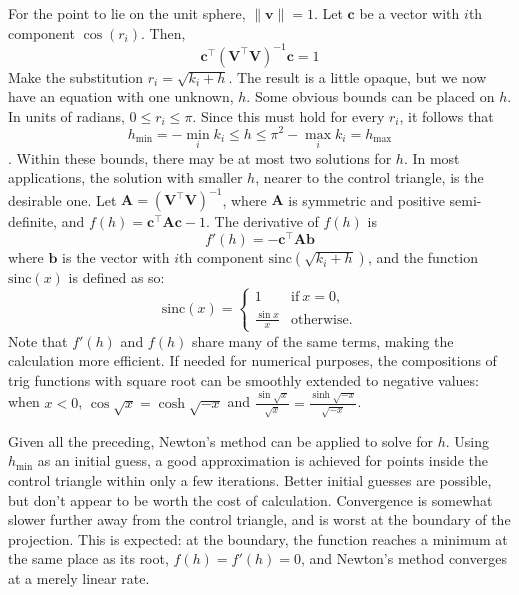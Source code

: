 \documentclass{amsart}[12pt]
\begin{document}
For the point to lie on the unit sphere, $\|\mathbf v\| = 1$. Let $\mathbf c$
be a vector with $i$th component $\cos\left(r_i \right)$. Then,
\begin{equation}
  \mathbf c^\top \left(\mathbf V^\top \mathbf V\right )^{-1} \mathbf c = 1
\end{equation}
Make the substitution $r_i = \sqrt{k_i + h}$. The result is a little opaque,
but we now have an equation with one unknown, $h$. Some obvious bounds can be
placed on $h$. In units of radians, $0 \le r_i \le \pi$. Since this must hold
for every $r_i$, it follows that
$$
h_{\min} = -\min_i k_i \le h \le \pi^2 - \max_i k_i = h_{\max}
$$.
Within these bounds, there may be at most two solutions for $h$. In most
applications, the solution with smaller $h$, nearer to the control triangle, is
the desirable one. Let
$\mathbf A = \left(\mathbf V^\top \mathbf V\right )^{-1}$,
where $\mathbf A$ is symmetric and positive semi-definite, and
$f(h) = \mathbf c^\top \mathbf A \mathbf c - 1$. The derivative of $f(h)$ is
\begin{equation}
  f'(h) = -\mathbf c^\top \mathbf A \mathbf b
\end{equation}
where $\mathbf b$ is the vector with $i$th component
$\mathrm{sinc}\left(\sqrt{k_i + h}\right)$, and the function $\mathrm{sinc} (x)$
is defined as so:
\begin{equation}
\mathrm{sinc} (x) = \begin{cases}
      1 & \text{if}\ x=0, \\
      \frac{\sin x}{x} & \text{otherwise}.
    \end{cases}
\end{equation}
Note that $f'(h)$ and $f(h)$ share many of the same terms, making the
calculation more efficient. If needed for numerical purposes, the compositions
of trig functions with square root can be smoothly extended to negative values:
when $x<0$, $\cos \sqrt{x} = \cosh \sqrt{-x}$
and $\frac{\sin \sqrt{x}}{\sqrt{x}} = \frac{\sinh \sqrt{-x}}{\sqrt{-x}}$.

Given all the preceding, Newton's method can be applied to solve for $h$.
Using $h_{\min}$ as an initial guess, a good approximation is achieved for
points inside the control triangle within only a few iterations. Better initial
guesses are possible, but don't appear to be worth the cost of calculation.
Convergence is somewhat slower further away from the control triangle, and is
worst at the boundary of the projection. This is expected: at the boundary, the
function reaches a minimum at the same place as its root, $f(h)=f'(h)=0$, and
Newton's method converges at a merely linear rate.\cite{burden}
\end{document}
